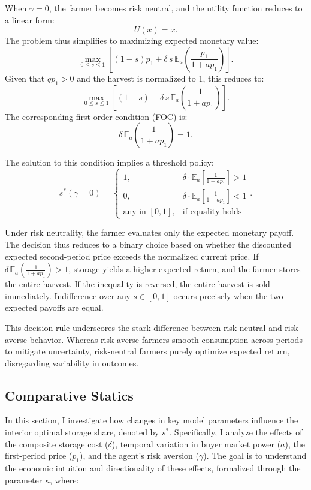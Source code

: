 \noindent When $\gamma = 0$, the farmer becomes risk neutral, and the utility function reduces to a linear form:
\[
U(x) = x.
\]
\noindent The problem thus simplifies to maximizing expected monetary value:
\[
\max_{0 \leq s \leq 1} \left[ (1-s) p_1 + \delta \, s \, \mathbb{E}_{a}\left( \frac{p_1}{1 + a p_1} \right) \right].
\]
\noindent Given that $q p_1 > 0$ and the harvest is normalized to 1, this reduces to:
\[
\max_{0 \leq s \leq 1} \left[ (1-s) + \delta\, s \, \mathbb{E}_a\left( \frac{1}{1 + a p_1} \right) \right].
\]
\noindent The corresponding first-order condition (FOC) is:
\[
\delta \, \mathbb{E}_a\left( \frac{1}{1 + a p_1} \right) = 1.
\]

\noindent The solution to this condition implies a threshold policy:
\begin{equation}
s^*(\gamma = 0) = 
\begin{cases}
1, & \delta \cdot \mathbb{E}_a\left[\frac{1}{1 + a p_1}\right] > 1 \\
0, & \delta \cdot \mathbb{E}_a\left[\frac{1}{1 + a p_1}\right] < 1 \\
\text{any in } [0,1], & \text{if equality holds}
\end{cases}.
\end{equation}

Under risk neutrality, the farmer evaluates only the expected monetary payoff. The decision thus reduces to a binary choice based on whether the discounted expected second-period price exceeds the normalized current price. If $\delta \, \mathbb{E}_{a}\left( \frac{1}{1 + a p_1} \right) > 1$, storage yields a higher expected return, and the farmer stores the entire harvest. If the inequality is reversed, the entire harvest is sold immediately. Indifference over any $s \in [0,1]$ occurs precisely when the two expected payoffs are equal.

This decision rule underscores the stark difference between risk-neutral and risk-averse behavior. Whereas risk-averse farmers smooth consumption across periods to mitigate uncertainty, risk-neutral farmers purely optimize expected return, disregarding variability in outcomes.




\subsection{Comparative Statics}

\noindent In this section, I investigate how changes in key model parameters influence the interior optimal storage share, denoted by $s^*$. Specifically, I analyze the effects of the composite storage cost ($\delta$), temporal variation in buyer market power ($a$), the first-period price ($p_1$), and the agent's risk aversion ($\gamma$). The goal is to understand the economic intuition and directionality of these effects, formalized through the parameter $\kappa$, where:

